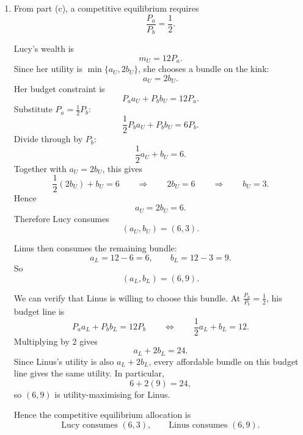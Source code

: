 \documentclass[12pt]{article}
\begin{document}
\begin{enumerate}[label=(\alph*)]
    Therefore there is excess demand for bananas.

    \paragraph{Case 2: \(\dfrac{P_a}{P_b}<\dfrac12\).}
    Then
    \[
    \frac{1}{P_a}>\frac{2}{P_b}.
    \]
    Apples give higher marginal utility per dollar, so Linus demands only apples. Since his wealth is \(12P_b\), his apple demand is
    \[
    a_L=\frac{12P_b}{P_a}.
    \]
    Because
    \[
    \frac{P_a}{P_b}<\frac12
    \qquad\Longrightarrow\qquad
    \frac{P_b}{P_a}>2,
    \]
    we have
    \[
    a_L=12\frac{P_b}{P_a}>24.
    \]
    Yet total supply of apples is only 12. Hence there is excess demand for apples.

    Therefore, if
    \[
    \frac{P_a}{P_b}\neq \frac12,
    \]
    there is always excess demand for one of the two goods. So we have shown
    \[
    \boxed{\frac{P_a}{P_b}\neq \frac12 \;\Longrightarrow\; \text{excess demand for one good}.}
    \]

    \item
    From part (c), a competitive equilibrium requires
    \[
    \boxed{\frac{P_a}{P_b}=\frac12.}
    \]

    Lucy's wealth is
    \[
    m_U=12P_a.
    \]
    Since her utility is \(\min\{a_U,2b_U\}\), she chooses a bundle on the kink:
    \[
    a_U=2b_U.
    \]
    Her budget constraint is
    \[
    P_a a_U + P_b b_U = 12P_a.
    \]
    Substitute \(P_a=\frac12 P_b\):
    \[
    \frac12 P_b a_U + P_b b_U = 6P_b.
    \]
    Divide through by \(P_b\):
    \[
    \frac12 a_U+b_U=6.
    \]
    Together with \(a_U=2b_U\), this gives
    \[
    \frac12(2b_U)+b_U=6
    \qquad\Longrightarrow\qquad
    2b_U=6
    \qquad\Longrightarrow\qquad
    b_U=3.
    \]
    Hence
    \[
    a_U=2b_U=6.
    \]
    Therefore Lucy consumes
    \[
    \boxed{(a_U,b_U)=(6,3).}
    \]

    Linus then consumes the remaining bundle:
    \[
    a_L=12-6=6,\qquad b_L=12-3=9.
    \]
    So
    \[
    \boxed{(a_L,b_L)=(6,9).}
    \]

    We can verify that Linus is willing to choose this bundle. At \(\frac{P_a}{P_b}=\frac12\), his budget line is
    \[
    P_a a_L+P_b b_L=12P_b
    \qquad\Longleftrightarrow\qquad
    \frac12 a_L+b_L=12.
    \]
    Multiplying by 2 gives
    \[
    a_L+2b_L=24.
    \]
    Since Linus's utility is also \(a_L+2b_L\), every affordable bundle on this budget line gives the same utility. In particular,
    \[
    6+2(9)=24,
    \]
    so \((6,9)\) is utility-maximising for Linus.

    Hence the competitive equilibrium allocation is
    \[
    \boxed{\text{Lucy consumes }(6,3),\qquad \text{Linus consumes }(6,9).}
    \]
\end{enumerate}
\end{document}
